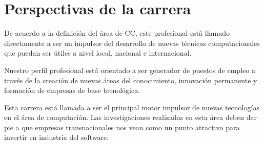 \section{Perspectivas de la carrera}\label{sec:cs-perspectivas-de-la-carrera}
De acuerdo a la definición del área de \ac{CC}, este profesional está llamado directamente a ser un impulsor del desarrollo de nuevas técnicas computacionales que puedan ser útiles a nivel local, nacional e internacional.

Nuestro perfil profesional está orientado a ser generador de puestos de empleo a través 
de la creación de nuevas áreas del conocimiento, innovación permanente y formación de
empresas de base tecnológica.

Esta carrera está llamada a ser el principal motor impulsor de nuevas tecnologías en el área de computación. Las investigaciones realizadas en esta área deben dar pie a que empresas transnacionales nos vean como un punto atractivo para invertir en industria del software.
